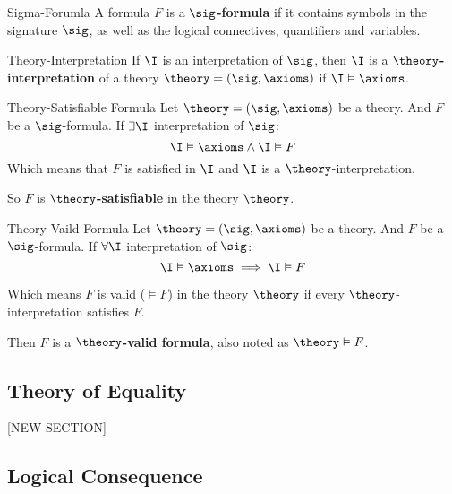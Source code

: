 \begin{definition}{Sigma-Forumla}
    A formula $F$ is a \textbf{$\sig$-formula} if it contains symbols in
    the signature $\sig$,
    as well as the logical connectives, quantifiers and variables.
\end{definition}

\begin{definition}{Theory-Interpretation}
    If $\I$ is an interpretation of $\sig$, then $\I$ is a \textbf{$\theory$-interpretation}
    of a theory $\theory = (\sig,\axioms)$ if $\I \vDash \axioms$.
\end{definition}

\begin{definition}{Theory-Satisfiable Formula}
    Let $\theory = (\sig,\axioms)$ be a theory. And $F$ be a $\sig$-formula.
    If $\exists \I$ interpretation of $\sig$:
    \begin{equation*}
        \I \vDash \axioms \land \I \vDash F
    \end{equation*}
    Which means that $F$ is satisfied in $\I$ and $\I$ is a $\theory$-interpretation.

    So $F$ is \textbf{$\theory$-satisfiable} in the theory $\theory$.
\end{definition}

\begin{definition}{Theory-Vaild Formula}
    Let $\theory = (\sig,\axioms)$ be a theory. And $F$ be a $\sig$-formula.
    If $\forall \I$ interpretation of $\sig$:
    \begin{equation*}
        \I \vDash \axioms \implies \I \vDash F
    \end{equation*}

    Which means $F$ is valid ($\vDash F$) in the theory $\theory$ if 
    every $\theory$-interpretation satisfies $F$.

    Then $F$ is a \textbf{$\theory$-valid formula}, also 
    noted as $\theory \vDash F$. 
\end{definition}

\subsection{Theory of Equality}
\label{subsec:Theory of Equality}

[NEW SECTION]

\subsection{Logical Consequence}
\label{subsec:Logical Consequence}

